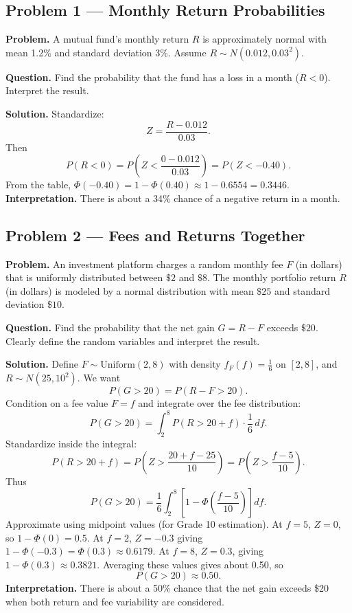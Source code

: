 	
	\begin{ExamProblems}
		
		\hypertarget{c10-ex1}{}
		\item
		\subsection*{Problem 1 — Monthly Return Probabilities}
		
		\textbf{Problem.}
		A mutual fund's monthly return \(R\) is approximately normal with mean 1.2\% and
		standard deviation 3\%. Assume \(R\sim N(0.012,0.03^2)\).
		
		\textbf{Question.} Find the probability that the fund has a loss in a month
		(\(R<0\)). Interpret the result.
		
		\textbf{Solution.}
		Standardize:
		\[
		Z=\frac{R-0.012}{0.03}.
		\]
		Then
		\[
		P(R<0)=P\left(Z<\frac{0-0.012}{0.03}\right)=P(Z<-0.40).
		\]
		From the table, \(\Phi(-0.40)=1-\Phi(0.40)\approx 1-0.6554=0.3446\).
		\textbf{Interpretation.} There is about a 34\% chance of a negative return in a month.
		
		
		\hypertarget{c10-ex2}{}
		\item
		\subsection*{Problem 2 — Fees and Returns Together}
		
		\textbf{Problem.}
		An investment platform charges a random monthly fee \(F\) (in dollars) that is uniformly
		distributed between \(\$2\) and \(\$8\). The monthly portfolio return \(R\) (in dollars)
		is modeled by a normal distribution with mean \(\$25\) and standard deviation \(\$10\).
		
		\textbf{Question.} Find the probability that the net gain \(G=R-F\) exceeds \(\$20\).
		Clearly define the random variables and interpret the result.
		
		\textbf{Solution.}
		Define \(F\sim\text{Uniform}(2,8)\) with density \(f_F(f)=\frac{1}{6}\) on \([2,8]\),
		and \(R\sim N(25,10^2)\).
		We want
		\[
		P(G>20)=P(R-F>20).
		\]
		Condition on a fee value \(F=f\) and integrate over the fee distribution:
		\[
		P(G>20)=\int_2^8 P(R>20+f)\cdot \frac{1}{6}\,df.
		\]
		Standardize inside the integral:
		\[
		P(R>20+f)=P\left(Z>\frac{20+f-25}{10}\right)=P\left(Z>\frac{f-5}{10}\right).
		\]
		Thus
		\[
		P(G>20)=\frac{1}{6}\int_2^8 \left[1-\Phi\left(\frac{f-5}{10}\right)\right]df.
		\]
		Approximate using midpoint values (for Grade 10 estimation). At \(f=5\), \(Z=0\), so
		\(1-\Phi(0)=0.5\). At \(f=2\), \(Z=-0.3\) giving \(1-\Phi(-0.3)=\Phi(0.3)\approx 0.6179\).
		At \(f=8\), \(Z=0.3\), giving \(1-\Phi(0.3)\approx 0.3821\).
		Averaging these values gives about 0.50, so
		\[
		P(G>20)\approx 0.50.
		\]
		\textbf{Interpretation.} There is about a 50\% chance that the net gain exceeds \$20
		when both return and fee variability are considered.
		
	\end{ExamProblems}
	

